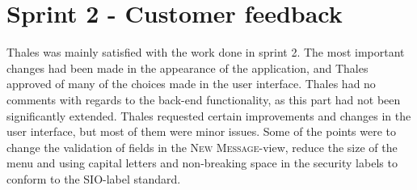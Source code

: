 \section{Sprint 2 - Customer feedback}
Thales was mainly satisfied with the work done in sprint 2. The most important changes had been made in the appearance of the application, and Thales approved of many of the choices made in the user interface. Thales had no comments with regards to the back-end functionality, as this part had not been significantly extended. 
\newline
\newline
Thales requested certain improvements and changes in the user interface, but most of them were minor issues. Some of the points were to change the validation of fields in the \textsc{New Message}-view, reduce the size of the menu and using capital letters and non-breaking space in the security labels to conform to the SIO-label standard.